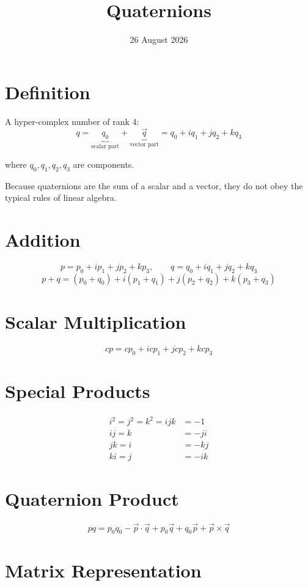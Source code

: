 \documentclass[11pt]{article}
\title{Quaternions}
\date{26 August 2026}
\author{}
\newcommand{\vect}[1]{\vec{#1}}
\begin{document}
\maketitle
\vspace{-2em}

\section*{Definition}

A hyper-complex number of rank 4:
\[
q = \underbrace{q_0}_{\text{scalar part}} + \underbrace{\vect{q}}_{\text{vector part}}
 = q_0 + i q_1 + j q_2 + k q_3
\]

where $q_0, q_1, q_2, q_3$ are components.

Because quaternions are the sum of a scalar and a vector, they do not obey the typical rules of linear algebra.

\section*{Addition}

\[
p = p_0 + i p_1 + j p_2 + k p_3, \qquad q = q_0 + i q_1 + j q_2 + k q_3
\]
\[
p + q = (p_0 + q_0) + i(p_1+q_1) + j(p_2+q_2) + k(p_3+q_3)
\]

\section*{Scalar Multiplication}

\[
cp = c p_0 + i c p_1 + j c p_2 + k c p_3
\]

\section*{Special Products}

\begin{align*}
i^2 = j^2 = k^2 = ijk &= -1 \\
ij = k &= -ji \\
jk = i &= -kj \\
ki = j &= -ik
\end{align*}

\section*{Quaternion Product}

\[
pq = p_0 q_0 - \vect{p}\cdot\vect{q} + p_0 \vect{q} + q_0 \vect{p} + \vect{p}\times\vect{q}
\]

\section*{Matrix Representation}
\end{document}
